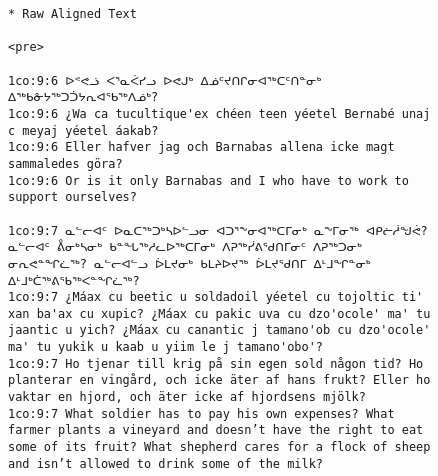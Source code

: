 \documentclass[12pt]{article}
\begin{document}
\begin{figure}
\begin{verbatim}
* Raw Aligned Text

<pre>

1co:9:6 ᐅᕝᕙᓘ ᐸᕐᓇᐹᓯᓗ ᐅᕙᒍᒃ ᐃᓅᑦᔪᑎᒋᓂᐊᖅᑕᑦᑎᓐᓂᒃ ᐃᖅᑲᓁᔭᖅᑐᑑᔭᕆᐊᖃᖅᐱᓅᒃ? 
1co:9:6 ¿Wa ca tucultique'ex chéen teen yéetel Bernabé unaj c meyaj yéetel áakab? 
1co:9:6 Eller hafver jag och Barnabas allena icke magt sammaledes göra? 
1co:9:6 Or is it only Barnabas and I who have to work to support ourselves?

1co:9:7 ᓇᓪᓕᐊᑦ ᐅᓇᑕᖅᑐᒃᓴᐅᓪᓗᓂ ᐊᑐᕐᖕᓂᐊᖅᑕᒥᓂᒃ ᓇᖕᒥᓂᖅ ᐊᑭᓖᓲᖑᕚ? ᓇᓪᓕᐊᑦ ᕔᓂᒃᓴᓂᒃ ᑲᓐᖓᖅᓱᓚᐅᖅᑕᒥᓂᒃ ᐱᕈᖅᓰᕕᖁᑎᒥᓂᑦ ᐱᕈᖅᑐᓂᒃ ᓂᕆᕙᓐᖏᓛᖅ? ᓇᓪᓕᐊᓪᓗ ᐆᒪᔪᓂᒃ ᑲᒪᔨᐅᔪᖅ ᐆᒪᔪᖁᑎᒥ ᐃᒻᒧᖏᓐᓂᒃ ᐃᒻᒧᒃᑖᖅᕕᖃᖅᐸᓐᖏᓛᖅ?
1co:9:7 ¿Máax cu beetic u soldadoil yéetel cu tojoltic ti' xan ba'ax cu xupic? ¿Máax cu pakic uva cu dzo'ocole' ma' tu jaantic u yich? ¿Máax cu canantic j tamano'ob cu dzo'ocole' ma' tu yukik u kaab u yiim le j tamano'obo'? 
1co:9:7 Ho tjenar till krig på sin egen sold någon tid? Ho planterar en vingård, och icke äter af hans frukt? Eller ho vaktar en hjord, och äter icke af hjordsens mjölk? 
1co:9:7 What soldier has to pay his own expenses? What farmer plants a vineyard and doesn’t have the right to eat some of its fruit? What shepherd cares for a flock of sheep and isn’t allowed to drink some of the milk? 

\end{verbatim}
\end{figure}
\end{document}
